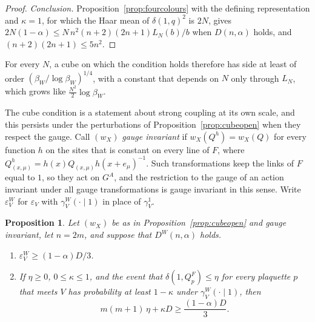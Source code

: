 \documentclass[11pt]{amsart}
\newtheorem{proposition}[theorem]{Proposition}
\theoremstyle{definition}
\theoremstyle{remark}
\numberwithin{equation}{section}
\begin{document}
\begin{proof}
\emph{Conclusion.} Proposition~\ref{prop:fourcolours} with the defining
representation and $\kappa=1$, for which the Haar mean of $\delta(1,q)^2$ is
$2N$, gives $2N(1-\alpha)\le N\,n^2(n+2)(2n+1)L_N(b)/b$ when $D(n,\alpha)$
holds, and $(n+2)(2n+1)\le5n^2$.
\end{proof}

For every $N$, a cube on which the condition holds therefore has side at
least of order $(\beta_W/\log\beta_W)^{1/4}$, with a constant that depends on
$N$ only through $L_N$, which grows like $\frac{N^2}2\log\beta_W$.

The cube condition is a statement about strong coupling at its own scale,
and this persists under the perturbations of
Proposition~\ref{prop:cubeopen} when they respect the gauge. Call $(w_X)$
\emph{gauge invariant} if $w_X(Q^h)=w_X(Q)$ for every function $h$ on the
sites that is constant on every line of $F$, where
$Q^h_{(x,\mu)}=h(x)Q_{(x,\mu)}h(x+e_\mu)^{-1}$. Such transformations keep
the links of $F$ equal to $1$, so they act on $G^A$, and the restriction to
the gauge of an action invariant under all gauge transformations is gauge
invariant in this sense. Write $\varepsilon^W_V$ for $\varepsilon_V$ with
$\gamma^W_V(\cdot\mid1)$ in place of $\gamma^1_V$.

\begin{proposition}\label{prop:smallfield}
Let $(w_X)$ be as in Proposition~\ref{prop:cubeopen} and gauge invariant,
let $n=2m$, and suppose that $D^W(n,\alpha)$ holds.
\begin{enumerate}[label=\textup{(\roman*)},leftmargin=*]
\item $\varepsilon^W_V\ge(1-\alpha)D/3$.
\item If $\eta\ge0$, $0\le\kappa\le1$, and the event that
$\delta(1,Q^F_p)\le\eta$ for every plaquette $p$ that meets $V$ has
probability at least $1-\kappa$ under $\gamma^W_V(\cdot\mid1)$, then
\[
m(m+1)\,\eta+\kappa D\ge\frac{(1-\alpha)D}3 .
\]
\end{enumerate}
\end{proposition}
\end{document}
